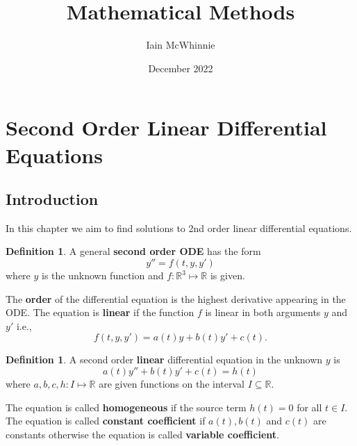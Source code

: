 \documentclass{article}
\title{Mathematical Methods}
\author{Iain McWhinnie}
\date{December 2022}
\theoremstyle{plain}
\theoremstyle{definition}
\newtheorem{definition}[thm]{Definition}
\numberwithin{equation}{section}
\begin{document}
\maketitle

\tableofcontents

\section{Second Order Linear Differential Equations}

\subsection{Introduction}

In this chapter we aim to find solutions to 2nd order linear differential equations.

\begin{definition}
A general \textbf{second order ODE} has the form
\[
y'' = f(t,y,y')
\]
where $y$ is the unknown function and $f: \mathbb{R}^3 \mapsto \mathbb{R}$ is given.


The \textbf{order} of the differential equation  is the highest derivative appearing in the ODE. The equation is \textbf{linear} if the function $f$ is linear in both arguments $y$ and $y'$ i.e.,
\[
f(t,y,y') = a(t)y + b(t)y' + c(t).
\]

\end{definition}

\begin{definition}
    A second order \textbf{linear} differential equation in the unknown $y$ is
    \begin{equation}
        a(t)y'' + b(t)y' + c(t) = h(t)
    \end{equation}
    where $a,b,c,h: I \mapsto \mathbb{R}$ are given functions on the interval $I \subseteq \mathbb{R}$. 
    
    The equation is called \textbf{homogeneous} if the source term $h(t)=0$ for all $t\in I$. The equation is called \textbf{constant coefficient} if $a(t), b(t)$ and $c(t)$ are constants otherwise the equation is called \textbf{variable coefficient}.

\end{definition}
\end{document}
